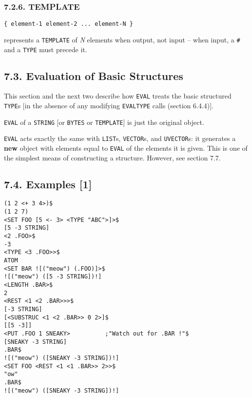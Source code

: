 \documentclass[a4paper,]{article}
\begin{document}
\subsubsection{7.2.6. TEMPLATE}\label{template}

\begin{verbatim}
{ element-1 element-2 ... element-N }
\end{verbatim}

  represents a
\texttt{TEMPLATE} of \emph{N} elements when output, not input -- when input, a \texttt{\#}
and a \texttt{TYPE} must precede it.

\subsection{7.3. Evaluation of Basic Structures}\label{evaluation-of-basic-structures}

This section and the next two describe how \texttt{EVAL} treats the basic structured \texttt{TYPE}s {[}in the absence of
any modifying \texttt{EVALTYPE} calls (section 6.4.4){]}.

\texttt{EVAL} of a \texttt{STRING} {[}or \texttt{BYTES} or \texttt{TEMPLATE}{]} is just the original object.

\texttt{EVAL} acts exactly the same with \texttt{LIST}s, \texttt{VECTOR}s, and \texttt{UVECTOR}s: it generates a
\textbf{new} object with elements equal to \texttt{EVAL} of the elements it is given. This is one of the simplest means of
constructing a structure. However, see section 7.7.

\subsection{7.4. Examples {[}1{]}}\label{examples-1}

\begin{verbatim}
(1 2 <+ 3 4>)$
(1 2 7)
<SET FOO [5 <- 3> <TYPE "ABC">]>$
[5 -3 STRING]
<2 .FOO>$
-3
<TYPE <3 .FOO>>$
ATOM
<SET BAR ![("meow") (.FOO)]>$
![("meow") ([5 -3 STRING])!]
<LENGTH .BAR>$
2
<REST <1 <2 .BAR>>>$
[-3 STRING]
[<SUBSTRUC <1 <2 .BAR>> 0 2>]$
[[5 -3]]
<PUT .FOO 1 SNEAKY>          ;"Watch out for .BAR !"$
[SNEAKY -3 STRING]
.BAR$
![("meow") ([SNEAKY -3 STRING])!]
<SET FOO <REST <1 <1 .BAR>> 2>>$
"ow"
.BAR$
![("meow") ([SNEAKY -3 STRING])!]
\end{verbatim}

\end{document}
